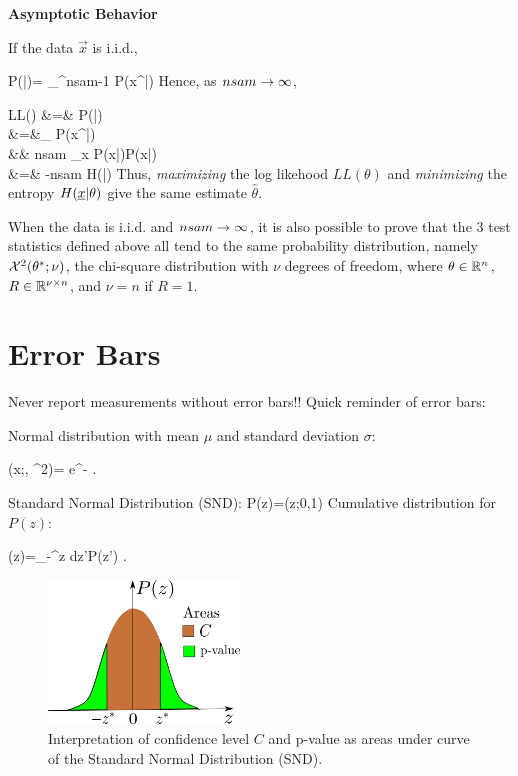 {\bf Asymptotic Behavior}

If the data 
$\vec{x}$ is i.i.d.,

\beq
P(|\theta)=
\prod_{}^{nsam-1} P(x^\s|\theta)
\;
\eeq
Hence, as $nsam\rightarrow \infty$,

\beqa
LL(\theta)
&=&
\ln P(|\theta)
\\
&=&\sum_\s \ln
P(x^\s|\theta)
\\
&\rarrow&
nsam \sum_x P(x|\theta)\ln  P(x|\theta)
\\
&=&
-nsam \; H(\rvx|\theta)
\eeqa
Thus, {\it maximizing} the log likehood
$LL(\theta)$
and {\it minimizing} the entropy
$H({\underline{x}}|\theta)$ 
give the same estimate $\hat{\theta}$.

When the 
data is i.i.d. and
$nsam\rightarrow \infty$,
it is also possible to 
prove that 
the 3 test statistics
defined above all tend to 
the same
probability  distribution, namely 
${\cal X}^2(\theta^*; \nu)$,
the chi-square distribution
with $\nu$ degrees of freedom,
where $\theta\in { \mathbb{R}}^n$, $R\in { \mathbb{R}}^
{\nu\times n}$, and $\nu=n$ if $R=1$.

\section{Error Bars}
Never report measurements without error bars!!
Quick reminder of error bars:

Normal distribution
with mean $\mu$
and standard deviation $\sigma$:

\beq
\caln(x;\mu, \s^2)=
e^{- }
\;.
\eeq

Standard Normal Distribution (SND):
\beq
P(z)=\caln(z;0,1)
\eeq
Cumulative distribution for $P(z)$:

\beq
\Phi(z)=\int_{-\infty}^z dz'\;P(z')
\;.
\eeq

\begin{figure}[h!]
\centering
\includegraphics[width=2in]
{conventions/error-bars.png}
\caption{
Interpretation
of confidence level $C$
and p-value as areas under curve of the
Standard Normal Distribution (SND).} 
\label{fig-error-bars}
\end{figure}

